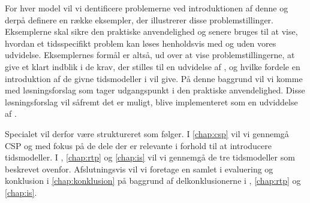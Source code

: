 For hver model vil vi dentificere problemerne ved introduktionen af denne og derpå definere en række eksempler, der illustrerer disse problemstillinger. Eksemplerne skal sikre den praktiske anvendelighed og senere bruges til at vise, hvordan et tidsspecifikt problem kan løses henholdsvis med og uden vores udvidelse. Eksemplernes formål er altså, ud over at vise problemstillingerne, at give et klart indblik i de krav, der stilles til en udvidelse af \pycsp, og hvilke fordele en introduktion af de givne tidsmodeller i \pycsp vil give. På denne baggrund vil vi komme med løsningsforslag som tager udgangspunkt i den praktiske anvendelighed. Disse løsningsforslag vil såfremt det er muligt, blive implementeret som en udviddelse af \pycsp.

Specialet vil derfor være struktureret som følger. I \autoref{chap:csp} vil vi gennemgå CSP og \pycsp med fokus på de dele der er relevante i forhold til at introducere tidsmodeller. I , \ref{chap:rtp} og \ref{chap:is} vil vi gennemgå de tre tidsmodeller som beskrevet ovenfor. Afslutningsvis vil vi foretage en samlet i evaluering og konklusion i \autoref{chap:konklusion} på baggrund af delkonklusionerne i , \ref{chap:rtp} og \ref{chap:is}.




